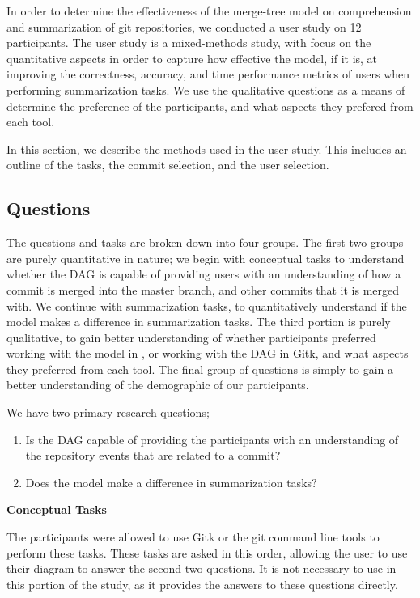 
In order to determine the effectiveness of the merge-tree model on
comprehension and summarization of git repositories, we conducted a user
study on 12 participants. The user study is a mixed-methods study, with
focus on the quantitative aspects in order to capture how effective the
\mt model, if it is, at improving the correctness, accuracy, and time
performance metrics of users when performing summarization tasks. We use
the qualitative questions as a means of determine the preference of the
participants, and what aspects they prefered from each tool.

In this section, we describe the methods used in the user study. This
includes an outline of the tasks, the commit selection, and the user
selection.

\subsection{Questions}
\label{sub:questions}

The questions and tasks are broken down into four groups. The first two
groups are purely quantitative in nature; we begin with conceptual tasks
to understand whether the DAG is capable of providing users with an
understanding of how a commit is merged into the master branch, and
other commits that it is merged with. We continue with summarization
tasks, to quantitatively understand if the \mt model makes a difference
in summarization tasks. The third portion is purely qualitative, to gain
better understanding of whether participants preferred working with the
\mt model in \tool, or working with the DAG in Gitk, and what aspects
they preferred from each tool. The final group of questions is simply to
gain a better understanding of the demographic of our participants.


We have two primary research questions;
\begin{enumerate}
  \item Is the DAG capable of providing the participants with an
    understanding of the repository events that are related to a commit?
  \item Does the \mt model make a difference in summarization tasks?
\end{enumerate}

\textbf{Conceptual Tasks}

The participants were allowed to use Gitk or the git command line tools
to perform these tasks. These tasks are asked in this order, allowing
the user to use their diagram to answer the second two questions. It is
not necessary to use \tool in this portion of the study, as it provides
the answers to these questions directly.

